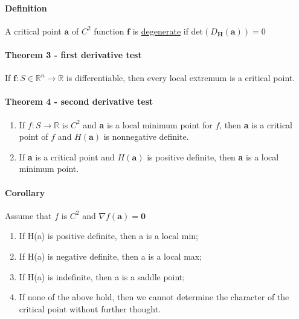\documentclass[11pt]{article}
\newcommand{\tb}[1]{\textbf{#1}}
\newcommand{\real}[0]{\mathbb{R}}
\newcommand{\under}[1]{\underline{#1}}
\begin{document}
\paragraph{Definition} A critical point $\tb{a}$ of $C^2$ function $\tb{f}$ is \under{degenerate} if det$(D_\tb{H}(\tb{a})) = 0$
\paragraph{Theorem 3 - first derivative test} If $\tb{f}: S \in \real^n \rightarrow \real$ is differentiable, then every local extremum is a critical point.
\paragraph{Theorem 4 - second derivative test}
\begin{enumerate}
    \item If $f: S \rightarrow \real$ is $C^2$ and \tb{a} is a local minimum point for $f$, then \tb{a} is a critical point of $f$ and $H(\tb{a})$ is nonnegative definite.
    \item If \tb{a} is a critical point and $H(\tb{a})$ is positive definite, then \tb{a} is a local minimum point.
\end{enumerate}
\paragraph{Corollary} Assume that $f$ is $C^2$ and $\nabla f(\tb{a}) = \tb{0}$
\begin{enumerate}
    \item If H(a) is positive definite, then a is a local min;
    \item If H(a) is negative definite, then a is a local max;
    \item If H(a) is indefinite, then a is a saddle point;
    \item If none of the above hold, then we cannot determine the character of the critical point without further thought.
\end{enumerate} 
\end{document}
